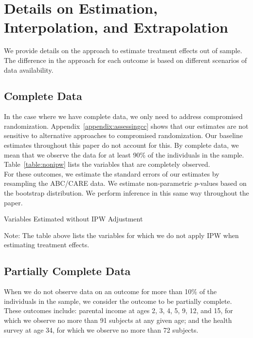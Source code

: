 \section{Details on Estimation, Interpolation, and Extrapolation} \label{appendix:methodology}

\noindent We provide details on the approach to estimate treatment effects out of sample. The difference in the approach for each outcome is based on different scenarios of data availability.

\subsection{Complete Data}
\label{app:method_fullobs}

\noindent  In the case where we have complete data, we only need to address compromised randomization. Appendix~\ref{appendix:assessingcc} shows that our estimates are not sensitive to alternative approaches to compromised randomization. Our baseline estimates throughout this paper do not account for this. By complete data, we mean that we observe the data for at least 90\% of the individuals in the sample. Table~\ref{table:nonipw} lists the variables that are completely observed.\\

\noindent For these outcomes, we estimate the standard errors of our estimates by resampling the ABC/CARE data. We estimate non-parametric $p$-values based on the bootstrap distribution. We perform inference in this same way throughout the paper.

\begin{table}[H]
\begin{threeparttable}
\caption{Variables Estimated without IPW Adjustment}
\label{table:nonipw}
\centering

\begin{tablenotes}
\footnotesize
\item Note: The table above lists the variables for which we do not apply IPW when estimating
treatment effects.
\end{tablenotes}
\end{threeparttable}
\end{table}

\subsection{Partially Complete Data}
\label{app:method_partialobs}

\noindent When we do not observe data on an outcome for more than 10\% of the individuals in the sample, we consider the outcome to be partially complete. These outcomes include: parental income at ages 2, 3, 4, 5, 9, 12, and 15, for which we observe no more than 91 subjects at any given age; and the health survey at age 34, for which we observe no more than 72 subjects.\\

